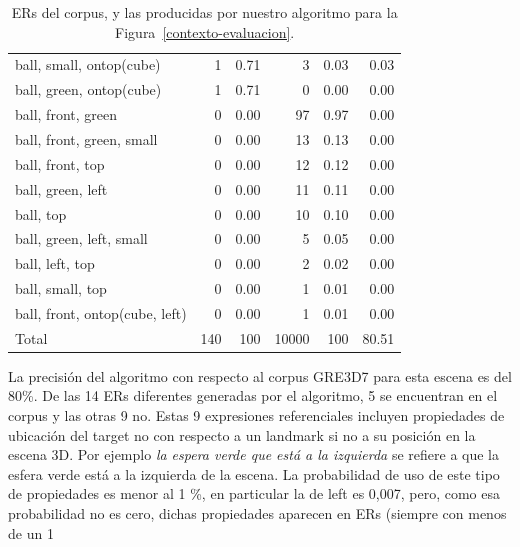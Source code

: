\begin{table}[H]
\begin{table}[H]
\begin{small}
\begin{center}
\begin{tabular}{|l|r|r|r|r|r|}
ball, small, ontop(cube)                       &  1 &  0.71 &    3 &  0.03 &  0.03 \\
ball, green, ontop(cube)                       &  1 &  0.71 &    0 &  0.00 &  0.00\\
ball, front, green                              &  0 &  0.00 &   97 &  0.97 &  0.00\\
ball, front, green, small                        &  0 &  0.00 &   13 &  0.13 &  0.00\\
ball, front, top                                &  0 &  0.00 &   12 &  0.12 &  0.00\\
ball, green, left	                              &  0 &  0.00 &   11 &  0.11 &  0.00\\
ball, top                                      &  0 &  0.00 &   10 &  0.10 &  0.00\\
ball, green, left, small                         &  0 &  0.00 &    5 &  0.05 &  0.00\\
ball, left, top                                 &  0 &  0.00 &    2 &  0.02 &  0.00\\
ball, small, top                                &  0 &  0.00 &    1 &  0.01 &  0.00\\
ball, front, ontop(cube, left)                  &  0 &  0.00 &    1 &  0.01 &  0.00\\

\hline
Total & 140 & 100 & 10000 & 100 & 80.51 \\
\hline
\end{tabular}
\caption{ERs del corpus, y las producidas por nuestro algoritmo para la Figura~\ref{contexto-evaluacion}.\label{results-algo-fig3}}
\vspace*{-.5cm}
\end{center}
\end{small}
\end{table}

 La precisi\'on del algoritmo con respecto al corpus GRE3D7 para esta escena es del 80\%. De las 14 ERs diferentes generadas por el algoritmo, 5 se encuentran en el corpus y las otras 9 no. Estas 9 expresiones referenciales incluyen propiedades de ubicaci\'on del target no con respecto a un landmark si no a su posici\'on en la escena 3D. Por ejemplo \emph{la espera verde que est\'a a la izquierda} se refiere a que la esfera verde est\'a a la izquierda de la escena.  La probabilidad de uso de este tipo de propiedades es menor al 1 \%, en particular la de left es 0,007, pero, como esa probabilidad no es cero, dichas propiedades aparecen en ERs (siempre con menos de un 1%


\end{table}
